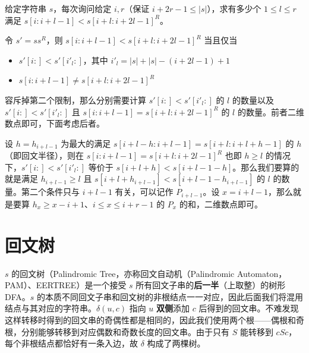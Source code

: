 \begin{exercise}[{[NOI2023] 字符串}]
    给定字符串 $s$，每次询问给定 $i,r$（保证 $i+2r-1\le |s|$），求有多少个 $1\le l\le r$ 满足 $s[i:i+l-1]<s[i+l:i+2l-1]^R$。 
\end{exercise}
\begin{solution}
    令 $s'=ss^R$，则 $s[i:i+l-1]<s[i+l:i+2l-1]^R$ 当且仅当
    \begin{itemize}
        \item $s'[i:]<s'[i'_l:]$，其中 $i'_l=|s|+|s|-(i+2l-1)+1$
        \item $s[i:i+l-1]\ne s[i+l:i+2l-1]^R$
    \end{itemize}
    容斥掉第二个限制，那么分别需要计算 $s'[i:]<s'[i'_l:]$ 的 $l$ 的数量以及 $s'[i:]<s'[i'_l:]$ 且 $s[i:i+l-1]=s[i+l:i+2l-1]^R$ 的 $l$ 的数量。前者二维数点即可，下面考虑后者。

    设 $h=h_{i+l-1}$ 为最大的满足 $s[i+l-h:i+l-1]=s[i+l:i+l+h-1]$ 的 $h$（即回文半径），则在 $s[i:i+l-1]=s[i+l:i+2l-1]^R$ 也即 $h\ge l$ 的情况下，$s'[i:]<s'[i'_l:]$ 等价于 $s[i+l+h]<s[i+l-1-h]$。那么我们要算的就是满足 $h_{i+l-1}\ge l$ 且 $s[i+l+h_{i+l-1}]<s[i+l-1-h_{i+l-1}]$ 的 $l$ 的数量。第二个条件只与 $i+l-1$ 有关，可以记作 $P_{i+l-1}$。设 $x=i+l-1$，那么就是要算 $h_{x}\ge x-i+1$、$i\le x\le i+r-1$ 的 $P_{x}$ 的和，二维数点即可。
\end{solution}


\section{回文树}

$s$ 的回文树（Palindromic Tree，亦称回文自动机（Palindromic Automaton，PAM）、EERTREE）是一个接受 $s$ 所有回文子串的\textbf{后一半}（上取整）的树形 DFA。$s$ 的本质不同回文子串和回文树的非根结点一一对应，因此后面我们将混用结点与其对应的字符串。$\delta(u,c)$ 指向 $u$ \textbf{双侧}添加 $c$ 后得到的回文串。不难发现这样转移时得到的回文串的奇偶性都是相同的，因此我们使用两个根——偶根和奇根，分别能够转移到对应偶数和奇数长度的回文串。由于只有 $S$ 能转移到 $cSc$，每个非根结点都恰好有一条入边，故 $\delta$ 构成了两棵树。


